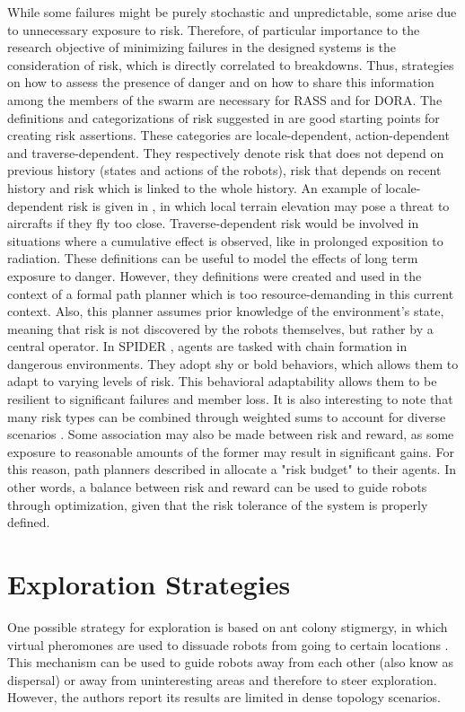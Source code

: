 While some failures might be purely stochastic and unpredictable, some arise due to unnecessary exposure to risk. Therefore, of particular importance to the research objective of minimizing failures in the designed systems is the consideration of risk, which is directly correlated to breakdowns. Thus, strategies on how to assess the presence of danger and on how to share this information among the members of the swarm are necessary for \ac{RASS} and for \ac{DORA}. The definitions and categorizations of risk suggested in \cite{xiao2020robot} are good starting points for creating risk assertions. These categories are locale-dependent, action-dependent and traverse-dependent. They respectively denote risk that does not depend on previous history (states and actions of the robots), risk that depends on recent history and risk which is linked to the whole history. An example of locale-dependent risk is given in \cite{de2011minimum}, in which local terrain elevation may pose a threat to aircrafts if they fly too close. Traverse-dependent risk would be involved in situations where a cumulative effect is observed, like in prolonged exposition to radiation. These definitions can be useful to model the effects of long term exposure to danger. However, they definitions were created and used in the context of a formal path planner which is too resource-demanding in this current context. Also, this planner assumes prior knowledge of the environment's state, meaning that risk is not discovered by the robots themselves, but rather by a central operator. In SPIDER \cite{hunt2020spider}, agents are tasked with chain formation in dangerous environments. They adopt shy or bold behaviors, which allows them to adapt to varying levels of risk. This behavioral adaptability allows them to be resilient to significant failures and member loss. It is also interesting to note that many risk types can be combined through weighted sums to account for diverse scenarios \cite{soltani2004fuzzy}. Some association may also be made between risk and reward, as some exposure to reasonable amounts of the former may result in significant gains. For this reason, path planners described in \cite{ono2008efficient,vitus2011feedback} allocate a "risk budget" to their agents. In other words, a balance between risk and reward can be used to guide robots through optimization, given that the risk tolerance of the system is properly defined.


\section{Exploration Strategies}
One possible strategy for exploration is based on ant colony stigmergy, in which virtual pheromones are used to dissuade robots from going to certain locations \cite{hunt2019testing}. This mechanism can be used to guide robots away from each other (also know as dispersal) or away from uninteresting areas and therefore to steer exploration. However, the authors report its results are limited in dense topology scenarios.

